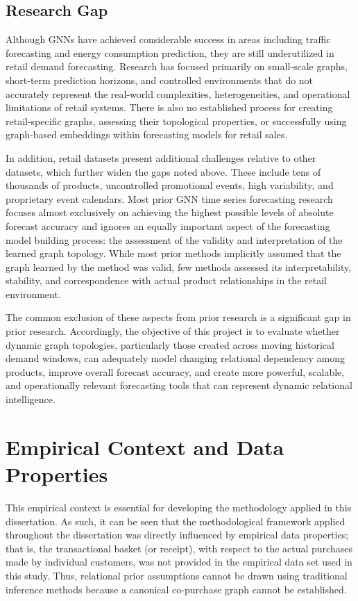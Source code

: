 \subsection{Research Gap}
Although \acp{GNN} have achieved considerable success in areas including traffic forecasting and energy consumption prediction, they are still underutilized in retail demand forecasting. Research has focused primarily on small-scale graphs, short-term prediction horizons, and controlled environments that do not accurately represent the real-world complexities, heterogeneities, and operational limitations of retail systems. There is also no established process for creating retail-specific graphs, assessing their topological properties, or successfully using graph-based embeddings within forecasting models for retail sales.

In addition, retail datasets present additional challenges relative to other datasets, which further widen the gaps noted above. These include tens of thousands of products, uncontrolled promotional events, high variability, and proprietary event calendars. Most prior \ac{GNN} time series forecasting research focuses almost exclusively on achieving the highest possible levels of absolute forecast accuracy and ignores an equally important aspect of the forecasting model building process: the assessment of the validity and interpretation of the learned graph topology. While most prior methods implicitly assumed that the graph learned by the method was valid, few methods assessed its interpretability, stability, and correspondence with actual product relationships in the retail environment.

The common exclusion of these aspects from prior research is a significant gap in prior research. Accordingly, the objective of this project is to evaluate whether dynamic graph topologies, particularly those created across moving historical demand windows, can adequately model changing relational dependency among products, improve overall forecast accuracy, and create more powerful, scalable, and operationally relevant forecasting tools that can represent dynamic relational intelligence.

\section{Empirical Context and Data Properties}
\label{sec:empirical_context}

This empirical context is essential for developing the methodology applied in this dissertation. As such, it can be seen that the methodological framework applied throughout the dissertation was directly influenced by empirical data properties; that is, the transactional basket (or receipt), with respect to the actual purchases made by individual customers, was not provided in the empirical data set used in this study. Thus, relational prior assumptions cannot be drawn using traditional inference methods because a canonical co-purchase graph cannot be established.


